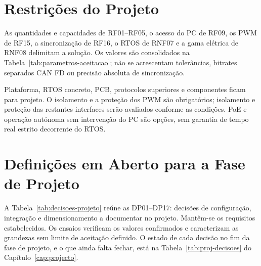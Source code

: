 \section{Restrições do Projeto}

As quantidades e capacidades de RF01--RF05, o acesso do PC de RF09,
os PWM de RF15, a sincronização de RF16, o RTOS de RNF07 e a gama
elétrica de RNF08 delimitam a solução. Os valores são consolidados na
Tabela~\ref{tab:parametros-aceitacao}; não se acrescentam tolerâncias,
bitrates separados CAN FD ou precisão absoluta de sincronização.

Plataforma, RTOS concreto, PCB, protocolos superiores e componentes ficam
para projeto. O isolamento e a proteção dos PWM são obrigatórios;
isolamento e proteção das restantes interfaces serão avaliados conforme
as condições. PoE e operação autónoma sem intervenção do PC são opções, sem garantia de
tempo real estrito decorrente do RTOS.

\section{Definições em Aberto para a Fase de Projeto}
\label{sec:definicoes-projeto}

A Tabela~\ref{tab:decisoes-projeto} reúne as DP01--DP17: decisões de
configuração, integração e dimensionamento a documentar no projeto.
Mantêm-se os requisitos estabelecidos. Os ensaios verificam os valores
confirmados e caracterizam as grandezas sem limite de aceitação definido.
\ifProjecto
O estado de cada decisão no fim da fase de projeto, e o que ainda falta
fechar, está na Tabela~\ref{tab:proj-decisoes} do
Capítulo~\ref{cap:projecto}.
\fi

